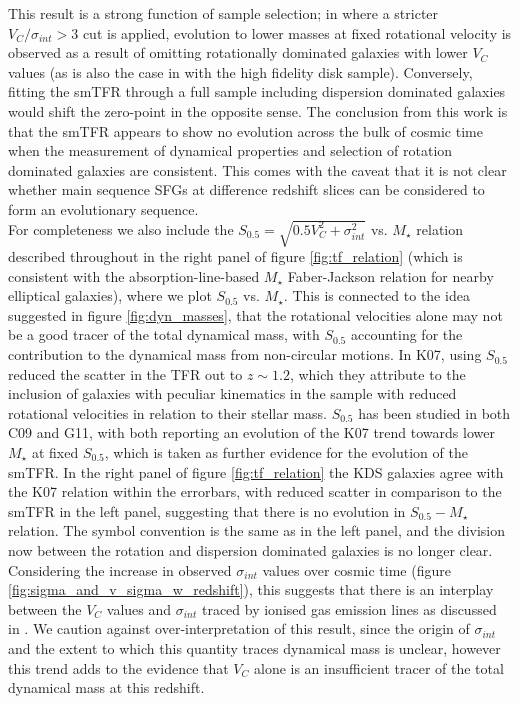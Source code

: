\documentclass[fleqn,usenatbib]{mn2e}
\begin{document}
This result is a strong function of sample selection; in \cite{Tiley2016a} where a stricter $V_{C}/\sigma_{int} > 3$ cut is applied, evolution to lower masses at fixed rotational velocity is observed as a result of omitting rotationally dominated galaxies with lower $V_{C}$ values (as is also the case in \cite{Cresci2009} with the high fidelity disk sample).
Conversely, fitting the smTFR through a full sample including dispersion dominated galaxies would shift the zero-point in the opposite sense.
The conclusion from this work is that the smTFR appears to show no evolution across the bulk of cosmic time when the measurement of dynamical properties and selection of rotation dominated galaxies are consistent.
This comes with the caveat that it is not clear whether main sequence SFGs at difference redshift slices can be considered to form an evolutionary sequence. \\

For completeness we also include the $S_{0.5} = \sqrt{0.5V_{C}^{2} + \sigma_{int}^{2}}$ vs. $M_{\star}$ relation described throughout \cite[K07][]{Kassin2007} in the right panel of figure \ref{fig:tf_relation} (which is consistent with the absorption-line-based $M_{\star}$ Faber-Jackson relation for nearby elliptical galaxies), where we plot $S_{0.5}$ vs. $M_{\star}$. 
This is connected to the idea suggested in figure \ref{fig:dyn_masses}, that the rotational velocities alone may not be a good tracer of the total dynamical mass, with $S_{0.5}$ accounting for the contribution to the dynamical mass from non-circular motions.
In K07, using $S_{0.5}$ reduced the scatter in the TFR out to $z\sim1.2$, which they attribute to the inclusion of galaxies with peculiar kinematics in the sample with reduced rotational velocities in relation to their stellar mass.
$S_{0.5}$ has been studied in both C09 and G11, with both reporting an evolution of the K07 trend towards lower $M_{\star}$ at fixed $S_{0.5}$, which is taken as further evidence for the evolution of the smTFR.
In the right panel of figure \ref{fig:tf_relation} the KDS galaxies agree with the K07 relation within the errorbars, with reduced scatter in comparison to the smTFR in the left panel, suggesting that there is no evolution in $S_{0.5}-M_{\star}$ relation.
The symbol convention is the same as in the left panel, and the division now between the rotation and dispersion dominated galaxies is no longer clear. 
Considering the increase in observed $\sigma_{int}$ values over cosmic time (figure \ref{fig:sigma_and_v_sigma_w_redshift}), this suggests that there is an interplay between the $V_{C}$ values and $\sigma_{int}$ traced by ionised gas emission lines as discussed in \cite{Kassin2012}. 
We caution against over-interpretation of this result, since the origin of $\sigma_{int}$ and the extent to which this quantity traces dynamical mass is unclear, however this trend adds to the evidence that $V_{C}$ alone is an insufficient tracer of the total dynamical mass at this redshift. \\
\end{document}
